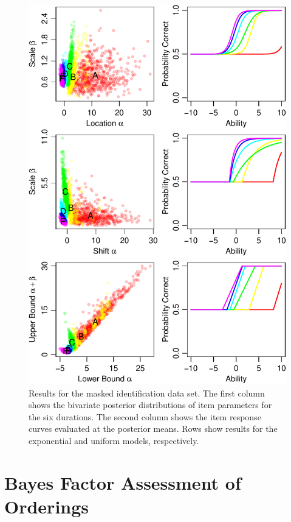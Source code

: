 \documentclass[english,,man]{apa6}
\begin{document}
\begin{figure}
\centering
\includegraphics{p_files/figure-latex/sl2Plot-1.pdf}
\caption{\label{fig:sl2Plot}Results for the masked identification data set. The first column shows the bivariate posterior distributions of item parameters for the six durations. The second column shows the item response curves evaluated at the posterior means. Rows show results for the exponential and uniform models, respectively.}
\end{figure}

\hypertarget{bayes-factor-assessment-of-orderings}{%
\section{Bayes Factor Assessment of Orderings}\label{bayes-factor-assessment-of-orderings}}
\end{document}
